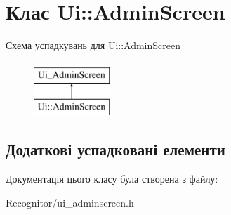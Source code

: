 \hypertarget{classUi_1_1AdminScreen}{\section{Клас Ui\-:\-:Admin\-Screen}
\label{classUi_1_1AdminScreen}
}
Схема успадкувань для Ui\-:\-:Admin\-Screen\begin{figure}[H]
\begin{center}
\leavevmode
\includegraphics[height=2.000000cm]{classUi_1_1AdminScreen}
\end{center}
\end{figure}
\subsection*{Додаткові успадковані елементи}


Документація цього класу була створена з файлу\-:\begin{DoxyCompactItemize}
\item 
Recognitor/ui\-\_\-adminscreen.\-h\end{DoxyCompactItemize}
